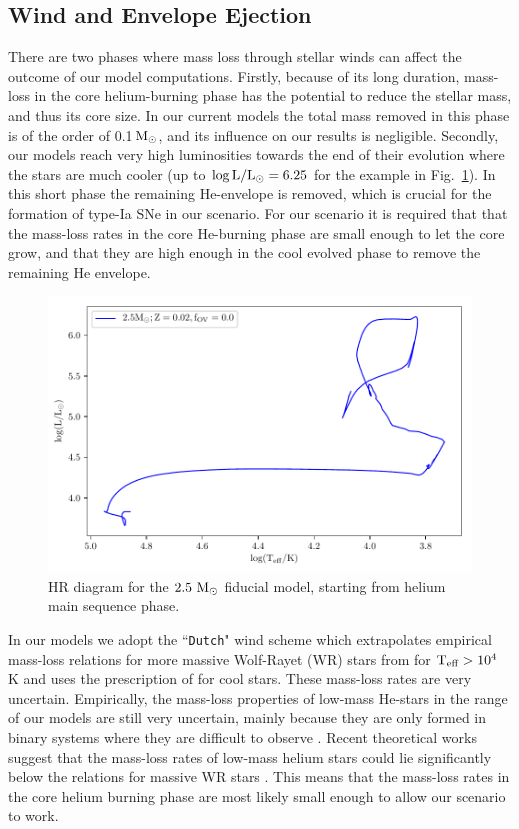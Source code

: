 \documentclass[../../main/thesis_msc.tex]{subfiles}
\begin{document}
    \subsection{Wind and Envelope Ejection} \label{sec:wind}
There are two phases where mass loss through stellar winds can affect the outcome of our model computations. Firstly, because of its long duration, mass-loss in the core helium-burning phase has the potential to reduce the stellar mass, and thus its core size. In our current models the total mass removed in this phase is of the order of 0.1\,$\rm M_\odot$, and its influence on our results is negligible. Secondly, our models reach very high luminosities towards the end of their evolution where the stars are much cooler (up to $\rm \log{L/L_\odot = 6.25}$ for the example in Fig.\, \ref{fig:HRD}). In this short phase the remaining He-envelope is removed, which is crucial for the formation of type-Ia SNe in our scenario. For our scenario it is required that that the mass-loss rates in the core He-burning phase are small enough to let the core grow, and that they are high enough in the cool evolved phase to remove the remaining He envelope.

    \begin{figure}[h!]
        \centering
        \includegraphics[width=0.6\columnwidth]{../figures/chapter4/HRD.pdf}
        \caption{HR diagram for the $\rm 2.5 \ M_{\odot}$ fiducial model, starting from helium main sequence phase.}
        \label{fig:HRD}
    \end{figure}


In our models we adopt the ``\texttt{Dutch}" \mesa wind scheme which extrapolates empirical mass-loss relations for more massive Wolf-Rayet (WR) stars from \cite{Nugis2000} for $\rm T_{\text{eff}} > 10^4$ K and uses the prescription of \cite{deJager1988} for cool stars. These mass-loss rates are very uncertain. Empirically, the mass-loss properties of low-mass He-stars in the range of our models are still very uncertain, mainly because they are only formed in binary systems where they are difficult to observe \citep{Smith2017,Zapartas2017}. Recent theoretical works suggest that the mass-loss rates of low-mass helium stars could lie significantly below the relations for massive WR stars \citep{Graefener2017,Vink2017}. This means that the mass-loss rates in the core helium burning phase are most likely small enough to allow our scenario to work.
        
\end{document}
